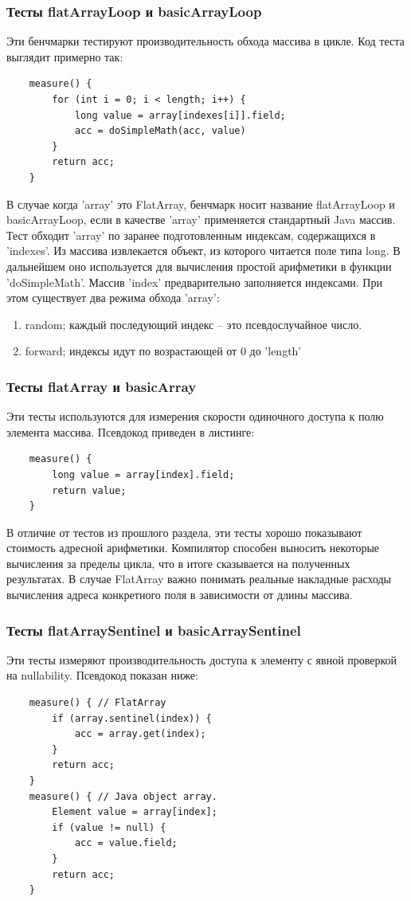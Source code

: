 \subsubsection{Тесты flatArrayLoop и basicArrayLoop}
Эти бенчмарки тестируют производительность обхода массива в цикле. Код теста выглядит примерно так:
\begin{lstlisting}
	measure() {
		for (int i = 0; i < length; i++) {
			long value = array[indexes[i]].field;
			acc = doSimpleMath(acc, value)
		}
		return acc;
	}
\end{lstlisting}
В случае когда 'array' это FlatArray, бенчмарк носит название flatArrayLoop и basicArrayLoop, если в качестве 'array' применяется стандартный Java массив.
Тест обходит 'array' по заранее подготовленным индексам, содержащихся в 'indexes'. 
Из массива извлекается объект, из которого читается поле типа long. В дальнейшем оно используется для вычисления простой арифметики в функции 'doSimpleMath'. 
Массив 'index' предварительно заполняется индексами. При этом существует два режима обхода 'array':
\begin{enumerate}
	\item random; каждый последующий индекс -- это псевдослучайное число.
	\item forward; индексы идут по возрастающей от 0 до 'length'
\end{enumerate}

\subsubsection{Тесты flatArray и basicArray}
Эти тесты используются для измерения скорости одиночного доступа к полю элемента массива. Псевдокод приведен в листинге:
\begin{lstlisting}
	measure() {
		long value = array[index].field;
		return value;
	}
\end{lstlisting}
В отличие от тестов из прошлого раздела, эти тесты хорошо показывают стоимость адресной арифметики. 
Компилятор способен выносить некоторые вычисления за пределы цикла, что в итоге сказывается на полученных результатах.
В случае FlatArray важно понимать реальные накладные расходы вычисления адреса конкретного поля в зависимости от длины массива.
\subsubsection{Тесты flatArraySentinel и basicArraySentinel}
Эти тесты измеряют производительность доступа к элементу с явной проверкой на nullability. Псевдокод показан ниже:
\begin{lstlisting}
	measure() { // FlatArray
		if (array.sentinel(index)) {
			acc = array.get(index);
		}
		return acc;
	}
	measure() { // Java object array.
		Element value = array[index];
		if (value != null) {
			acc = value.field;
		}
		return acc;
	}
\end{lstlisting}
